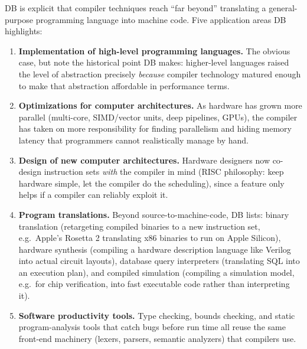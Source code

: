 \documentclass[11pt]{article}
\begin{document}
\dbtag DB is explicit that compiler techniques reach ``far beyond'' translating a
general-purpose programming language into machine code. Five application areas DB highlights:

\begin{enumerate}
  \item \textbf{Implementation of high-level programming languages.} The obvious case, but note
  the historical point DB makes: higher-level languages raised the level of abstraction
  precisely \emph{because} compiler technology matured enough to make that abstraction
  affordable in performance terms.
  \item \textbf{Optimizations for computer architectures.} As hardware has grown more parallel
  (multi-core, SIMD/vector units, deep pipelines, GPUs), the compiler has taken on more
  responsibility for finding parallelism and hiding memory latency that programmers cannot
  realistically manage by hand.
  \item \textbf{Design of new computer architectures.} Hardware designers now co-design
  instruction sets \emph{with} the compiler in mind (RISC philosophy: keep hardware simple, let
  the compiler do the scheduling), since a feature only helps if a compiler can reliably exploit
  it.
  \item \textbf{Program translations.} Beyond source-to-machine-code, DB lists: binary
  translation (retargeting compiled binaries to a new instruction set, e.g.\ Apple's Rosetta 2
  translating x86 binaries to run on Apple Silicon), hardware synthesis (compiling a hardware
  description language like Verilog into actual circuit layouts), database query interpreters
  (translating SQL into an execution plan), and compiled simulation (compiling a simulation
  model, e.g.\ for chip verification, into fast executable code rather than interpreting it).
  \item \textbf{Software productivity tools.} Type checking, bounds checking, and static
  program-analysis tools that catch bugs before run time all reuse the same front-end machinery
  (lexers, parsers, semantic analyzers) that compilers use.
\end{enumerate}
\end{document}
